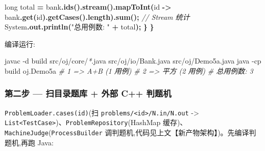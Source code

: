 \documentclass[
  11pt,
]{ctexart}
\newenvironment{Shaded}{\begin{snugshade}}{\end{snugshade}}
\newcommand{\AttributeTok}[1]{\textcolor[rgb]{0.13,0.29,0.53}{#1}}
\newcommand{\BuiltInTok}[1]{#1}
\newcommand{\CommentTok}[1]{\textcolor[rgb]{0.56,0.35,0.01}{\textit{#1}}}
\newcommand{\DataTypeTok}[1]{\textcolor[rgb]{0.13,0.29,0.53}{#1}}
\newcommand{\ExtensionTok}[1]{#1}
\newcommand{\FunctionTok}[1]{\textcolor[rgb]{0.13,0.29,0.53}{\textbf{#1}}}
\newcommand{\KeywordTok}[1]{\textcolor[rgb]{0.13,0.29,0.53}{\textbf{#1}}}
\newcommand{\NormalTok}[1]{#1}
\newcommand{\OperatorTok}[1]{\textcolor[rgb]{0.81,0.36,0.00}{\textbf{#1}}}
\newcommand{\PreprocessorTok}[1]{\textcolor[rgb]{0.56,0.35,0.01}{\textit{#1}}}
\newcommand{\StringTok}[1]{\textcolor[rgb]{0.31,0.60,0.02}{#1}}
\newcommand{\VariableTok}[1]{\textcolor[rgb]{0.00,0.00,0.00}{#1}}
\begin{document}
\begin{Shaded}
\begin{Highlighting}[]
        \DataTypeTok{long}\NormalTok{ total }\OperatorTok{=}\NormalTok{ bank}\OperatorTok{.}\FunctionTok{ids}\OperatorTok{().}\FunctionTok{stream}\OperatorTok{().}\FunctionTok{mapToInt}\OperatorTok{(}\NormalTok{id }\OperatorTok{{-}\textgreater{}}\NormalTok{ bank}\OperatorTok{.}\FunctionTok{get}\OperatorTok{(}\NormalTok{id}\OperatorTok{).}\FunctionTok{getCases}\OperatorTok{().}\FunctionTok{length}\OperatorTok{).}\FunctionTok{sum}\OperatorTok{();}  \CommentTok{// Stream 统计}
        \BuiltInTok{System}\OperatorTok{.}\FunctionTok{out}\OperatorTok{.}\FunctionTok{println}\OperatorTok{(}\StringTok{"总用例数: "} \OperatorTok{+}\NormalTok{ total}\OperatorTok{);}
    \OperatorTok{\}}
\OperatorTok{\}}
\end{Highlighting}
\end{Shaded}

编译运行:

\begin{Shaded}
\begin{Highlighting}[]
\ExtensionTok{javac} \AttributeTok{{-}d}\NormalTok{ build src/oj/core/}\PreprocessorTok{*}\NormalTok{.java src/oj/io/Bank.java src/oj/Demo5a.java}
\ExtensionTok{java} \AttributeTok{{-}cp}\NormalTok{ build oj.Demo5a}
\CommentTok{\# 1 =\textgreater{} A+B (1 用例)}
\CommentTok{\# 2 =\textgreater{} 平方 (2 用例)}
\CommentTok{\# 总用例数: 3}
\end{Highlighting}
\end{Shaded}

\hypertarget{ux7b2cux4e8cux6b65-ux626bux76eeux5f55ux9898ux5e93-ux5916ux90e8-c-ux5224ux9898ux673a}{%
\subsubsection{\texorpdfstring{第二步 \GC --- 扫目录题库 + 外部 C++
判题机}{第二步 --- 扫目录题库 + 外部 C++ 判题机}}\label{ux7b2cux4e8cux6b65-ux626bux76eeux5f55ux9898ux5e93-ux5916ux90e8-c-ux5224ux9898ux673a}}

\texttt{ProblemLoader.cases(id)}(扫
\texttt{problems/\textless{}id\textgreater{}/N.in/N.out} -\textgreater{}
\texttt{List\textless{}TestCase\textgreater{}})、\texttt{ProblemRepository}(HashMap
缓存)、\texttt{MachineJudge}(\texttt{ProcessBuilder}
调判题机,代码见上文【新产物架构】)。先编译判题机,再跑 Java:

\begin{Shaded}
\end{Shaded}
\end{document}

